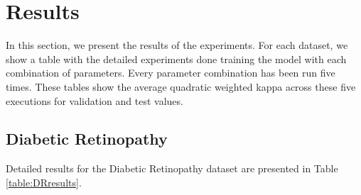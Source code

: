 \documentclass[journal]{IEEEtran}
\begin{document}
	\section{Results}
	\label{sect:results}
	In this section, we present the results of the experiments. For each dataset, we show a table with the detailed experiments done training the model with each combination of parameters. Every parameter combination has been run five times. These tables show the average quadratic weighted kappa across these five executions for validation and test values.
	
	\subsection{Diabetic Retinopathy}
	Detailed results for the Diabetic Retinopathy dataset are presented in Table \ref{table:DRresults}.
	
\end{document}
